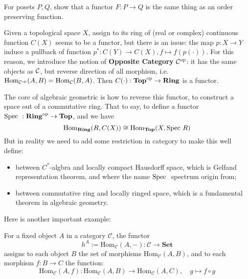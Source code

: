 \begin{exercise}
For posets $P,Q$, show that a functor $F:P\to Q$ is the same thing as an order preserving function.  
\end{exercise}

\begin{example}
  Given a topological space $X$, assign to its ring of (real or complex) continuous function $C(X)$ seems to be a functor, but there is an issue: the map $p:X\to Y$ induce a pullback of function $p^*:C(Y)\to C(X), f \mapsto f(p(\cdot))$. For this reason, we introduce the notion of \textbf{Opposite Category} $\mathcal{C}^{\mathrm{op}}$: it has the same objects as $\mathcal{C}$, but reverse direction of all morphism, i.e. $ \mathrm{Hom}_{\mathcal{C}^{\mathrm{op}}}(A,B)= \mathrm{Hom}_{\mathcal{C}}(B,A)$. Then $C(\cdot):\mathbf{Top}^{\mathrm{op}} \to \mathbf{Ring}$ is a functor.
\end{example}
\begin{remark}
 The core of algebraic geometric is how to reverse this functor, to construct a space out of a commutative ring. That to say, to define a functor $\mathrm{Spec}\  :\mathbf{Ring}^{\mathrm{op}} \to \mathbf{Top}$, and we have
 \[
   \mathrm{Hom}_{\mathbf{Ring}}(R, C(X)) \cong \mathrm{Hom}_{\mathbf{Top}}( X,\mathrm{Spec}\  R)
 \]
 But in reality we need to add some restriction in category to make this well define:
\begin{itemize}
  \item between $C^*$-algbra and locally compact Hausdorff space, which is Gelfand representation theorem, and where the name $\mathrm{Spec}\ $ spectrum origin from;
  \item between commutative ring and locally ringed space, which is a fundamental theorem in algebraic geometry.
\end{itemize}
\end{remark}

Here is another important example:

\begin{example}
  For a fixed object $A$ in a category $\mathcal{C}$, the functor
    \[
    h^A:=\mathrm{Hom}_{\mathcal{C}}(A, -): \mathcal{C} \to \mathbf{Set}
    \]
    assigns to each object $B$ the set of morphisms $\mathrm{Hom}_{\mathcal{C}}(A, B)$, and to each morphism $f: B \to C$ the function:
    \[
    \mathrm{Hom}_{\mathcal{C}}(A, f): \mathrm{Hom}_{\mathcal{C}}(A, B) \to \mathrm{Hom}_{\mathcal{C}}(A, C), \quad g \mapsto f \circ g
    \]
\end{example}

\begin{remark}
  
\end{remark}
  
